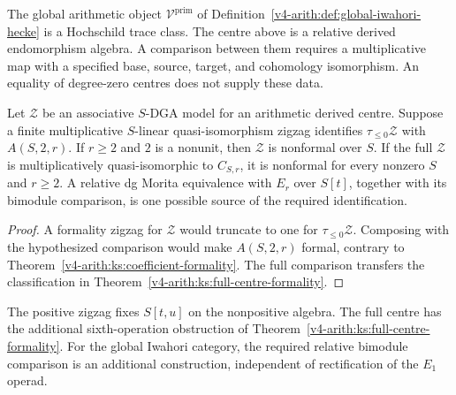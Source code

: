 The global arithmetic object
$\mathcal V^{\mathrm{prim}}$
of Definition~\ref{v4-arith:def:global-iwahori-hecke} is a Hochschild trace class.
The centre above is a relative derived endomorphism algebra.
A comparison between them requires a multiplicative map with a specified base,
source, target, and cohomology isomorphism.
An equality of degree-zero centres does not supply these data.

\begin{proposition}
\label{v4-arith:ks:centre-comparison-scope}
\ClaimStatusProvedHereConditional{}
Let $\mathcal Z$ be an associative $S$-DGA model for an arithmetic derived centre.
Suppose a finite multiplicative $S$-linear quasi-isomorphism zigzag identifies
$\tau_{\leq0}\mathcal Z$ with $A(S,2,r)$.
If $r\geq2$ and $2$ is a nonunit, then $\mathcal Z$ is nonformal over $S$.
If the full $\mathcal Z$ is multiplicatively quasi-isomorphic to $C_{S,r}$,
it is nonformal for every nonzero $S$ and $r\geq2$.
A relative dg Morita equivalence with $E_r$ over $S[t]$, together with
its bimodule comparison, is one possible source of the required identification.
\end{proposition}

\begin{proof}
A formality zigzag for $\mathcal Z$ would truncate to one for
$\tau_{\leq0}\mathcal Z$.
Composing with the hypothesized comparison would make $A(S,2,r)$ formal,
contrary to Theorem~\ref{v4-arith:ks:coefficient-formality}.
The full comparison transfers the classification in
Theorem~\ref{v4-arith:ks:full-centre-formality}.
\end{proof}

The positive zigzag fixes $S[t,u]$ on the nonpositive algebra.
The full centre has the additional sixth-operation obstruction of
Theorem~\ref{v4-arith:ks:full-centre-formality}.
For the global Iwahori category, the required relative bimodule comparison
is an additional construction, independent of rectification of the $E_1$ operad.
